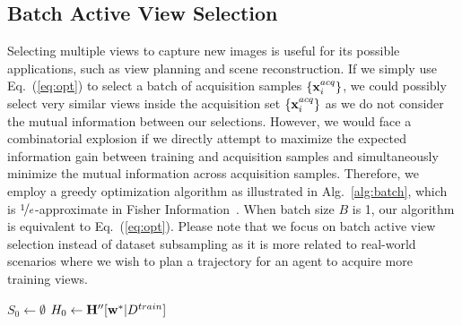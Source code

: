 \subsection{Batch Active View Selection}
\label{sec:batch}
Selecting multiple views to capture new images is useful for its possible applications, such as view planning and scene reconstruction. 
If we simply use Eq.~(\ref{eq:opt}) to select a batch of acquisition samples $\{{\bf x}^{acq}_i\}$, we could possibly select very similar views inside the acquisition set $\{{\bf x}^{acq}_i\}$ as we do not consider the mutual information between our selections. 
However, we would face a combinatorial explosion if we directly attempt to maximize the expected information gain between training and acquisition samples and simultaneously minimize the mutual information across acquisition samples. Therefore, we employ a greedy optimization algorithm as illustrated in Alg.~\ref{alg:batch}, which is $\nicefrac{1}{e}$-approximate in Fisher Information~\cite{nemhauser1978analysis}. When batch size $B$ is 1, our algorithm is equivalent to Eq.~(\ref{eq:opt}). 
Please note that we focus on batch active view selection instead of dataset subsampling as it is more related to real-world scenarios where we wish to plan a trajectory for an agent to acquire more training views. 

\begin{algorithm}\caption{Batch Active Views Selection}\label{alg:batch}
	\LinesNumbered

        $S_0 \leftarrow \emptyset$ \;
        $H_0 \leftarrow {\mathbf H}''[{\bf w}^*| D^{train}]$\;

	\For { $b \leftarrow 1$ \KwTo $B$}{
 	$i \leftarrow \argmax_{ \bxa \in  D^{pool}] \setminus S_{b-1} } \tr\left( \bH''[\bya | \bxa, \bw^*] \; H_{b-1}^{-1}\right)$\;
            $S_{b} \leftarrow S_{b-1} \cup \{ i \}$   \;
            $H_{b} \leftarrow H_{b-1} +  \bH''[\bya | \bxa, \bw^*] $  \;
        }
\end{algorithm}
